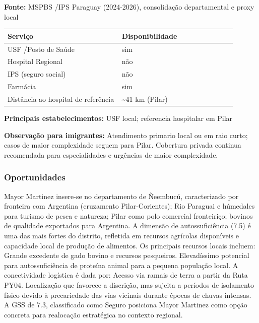 \textbf{Fonte:} MSPBS /\allowbreak  IPS Paraguay (2024-2026), consolidação
departamental e proxy local

{\def\LTcaptype{none} %
\begin{longtable}{@{}>{\raggedright\arraybackslash}p{0.45\linewidth} >{\raggedright\arraybackslash}p{0.45\linewidth}@{}}
\toprule\noalign{}
Serviço & Disponibilidade \\
\midrule\noalign{}
\endhead
\bottomrule\noalign{}
\endlastfoot
USF /\allowbreak  Posto de Saúde & sim \\
Hospital Regional & não \\
IPS (seguro social) & não \\
Farmácia & sim \\
Distância ao hospital de referência & \textasciitilde41 km (Pilar) \\
\end{longtable}
}

\textbf{Principais estabelecimentos:} USF local; referencia hospitalar
em Pilar

\textbf{Observação para imigrantes:} Atendimento primario local ou em
raio curto; casos de maior complexidade seguem para Pilar. Cobertura
privada continua recomendada para especialidades e urgências de maior
complexidade.
\newpage

\subsubsection*{Oportunidades}\label{oport-mayor-martinez-1210}
Mayor Martinez insere-se no departamento de Ñeembucú, caracterizado por fronteira com Argentina (cruzamento Pilar-Corientes); Rio Paraguai e húmedales para turismo de pesca e natureza; Pilar como polo comercial fronteiriço; bovinos de qualidade exportados para Argentina. A dimensão de autossuficiência (7.5) é uma das mais fortes do distrito, refletida em recursos agrícolas disponíveis e capacidade local de produção de alimentos. Os principais recursos locais incluem: Grande excedente de gado bovino e recursos pesqueiros. Elevadíssimo potencial para autossuficiência de proteína animal para a pequena população local. A conectividade logística é dada por: Acesso via ramais de terra a partir da Ruta PY04. Localização que favorece a discrição, mas sujeita a períodos de isolamento físico devido à precariedade das vias vicinais durante épocas de chuvas intensas. A GSS de 7.3, classificado como Seguro posiciona Mayor Martinez como opção concreta para realocação estratégica no contexto regional.

